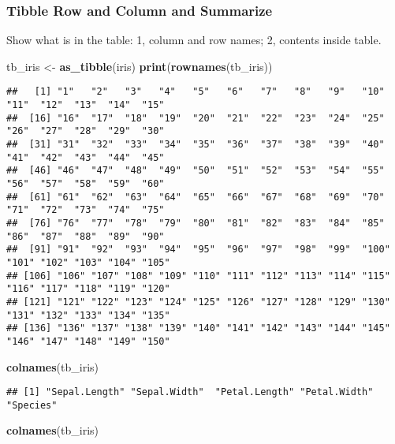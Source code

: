 \documentclass[
]{book}
\newenvironment{Shaded}{\begin{snugshade}}{\end{snugshade}}
\newcommand{\KeywordTok}[1]{\textcolor[rgb]{0.13,0.29,0.53}{\textbf{#1}}}
\newcommand{\NormalTok}[1]{#1}
\newcommand{\StringTok}[1]{\textcolor[rgb]{0.31,0.60,0.02}{#1}}
\begin{document}
\hypertarget{tibble-row-and-column-and-summarize}{%
\subsubsection{Tibble Row and Column and Summarize}\label{tibble-row-and-column-and-summarize}}

Show what is in the table: 1, column and row names; 2, contents inside table.

\begin{Shaded}
\begin{Highlighting}[]
\NormalTok{tb_iris <-}\StringTok{ }\KeywordTok{as_tibble}\NormalTok{(iris)}
\KeywordTok{print}\NormalTok{(}\KeywordTok{rownames}\NormalTok{(tb_iris))}
\end{Highlighting}
\end{Shaded}

\begin{verbatim}
##   [1] "1"   "2"   "3"   "4"   "5"   "6"   "7"   "8"   "9"   "10"  "11"  "12"  "13"  "14"  "15" 
##  [16] "16"  "17"  "18"  "19"  "20"  "21"  "22"  "23"  "24"  "25"  "26"  "27"  "28"  "29"  "30" 
##  [31] "31"  "32"  "33"  "34"  "35"  "36"  "37"  "38"  "39"  "40"  "41"  "42"  "43"  "44"  "45" 
##  [46] "46"  "47"  "48"  "49"  "50"  "51"  "52"  "53"  "54"  "55"  "56"  "57"  "58"  "59"  "60" 
##  [61] "61"  "62"  "63"  "64"  "65"  "66"  "67"  "68"  "69"  "70"  "71"  "72"  "73"  "74"  "75" 
##  [76] "76"  "77"  "78"  "79"  "80"  "81"  "82"  "83"  "84"  "85"  "86"  "87"  "88"  "89"  "90" 
##  [91] "91"  "92"  "93"  "94"  "95"  "96"  "97"  "98"  "99"  "100" "101" "102" "103" "104" "105"
## [106] "106" "107" "108" "109" "110" "111" "112" "113" "114" "115" "116" "117" "118" "119" "120"
## [121] "121" "122" "123" "124" "125" "126" "127" "128" "129" "130" "131" "132" "133" "134" "135"
## [136] "136" "137" "138" "139" "140" "141" "142" "143" "144" "145" "146" "147" "148" "149" "150"
\end{verbatim}

\begin{Shaded}
\begin{Highlighting}[]
\KeywordTok{colnames}\NormalTok{(tb_iris)}
\end{Highlighting}
\end{Shaded}

\begin{verbatim}
## [1] "Sepal.Length" "Sepal.Width"  "Petal.Length" "Petal.Width"  "Species"
\end{verbatim}

\begin{Shaded}
\begin{Highlighting}[]
\KeywordTok{colnames}\NormalTok{(tb_iris)}
\end{Highlighting}
\end{Shaded}
\end{document}
